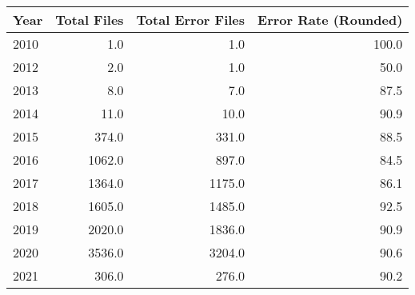 \begin{tabular}{lrrr}
\toprule
Year &  Total Files &  Total Error Files &  Error Rate (Rounded) \\
\midrule
2010 &          1.0 &                1.0 &                 100.0 \\
2012 &          2.0 &                1.0 &                  50.0 \\
2013 &          8.0 &                7.0 &                  87.5 \\
2014 &         11.0 &               10.0 &                  90.9 \\
2015 &        374.0 &              331.0 &                  88.5 \\
2016 &       1062.0 &              897.0 &                  84.5 \\
2017 &       1364.0 &             1175.0 &                  86.1 \\
2018 &       1605.0 &             1485.0 &                  92.5 \\
2019 &       2020.0 &             1836.0 &                  90.9 \\
2020 &       3536.0 &             3204.0 &                  90.6 \\
2021 &        306.0 &              276.0 &                  90.2 \\
\bottomrule
\end{tabular}
